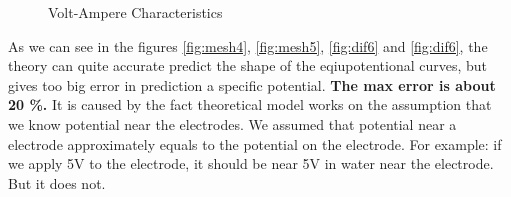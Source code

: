\documentclass{article}
\begin{document}
\begin{figure}[htb!]
\begin{center}
\begin{minipage}[h]{0.47\linewidth}
\end{minipage}
\hfill
\begin{minipage}[h]{0.47\linewidth}
\end{minipage}

\end{center}
\caption{Volt-Ampere Characteristics}
\label{fig:mesh6}
\end{figure}


As we can see in the figures \ref{fig:mesh4}, \ref{fig:mesh5}, \ref{fig:dif6} and \ref{fig:dif6}, the theory can quite accurate predict the shape of the eqiupotentional curves, but gives too big error in prediction a specific potential. \textbf{The max error is about 20 \%.} It is caused by the fact theoretical model works on the assumption that we know potential near the electrodes. We assumed that potential near a electrode approximately equals to the potential on the electrode. For example: if we apply 5V to the electrode, it should be near 5V in water near the electrode. But it does not. \par
\end{document}
